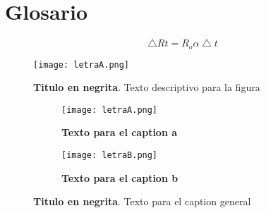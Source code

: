 
\newpage
\chapter*{Glosario}


\begin{equation}\label{eq:Label}
	\bigtriangleup Rt = R_{o}\alpha\bigtriangleup t 
\end{equation}


\begin{figure}[tb]
	\centering
	\texttt{[image: letraA.png]} %
	\caption[Titulo de la figura, este texto saldra en la lista de figuras]{\textbf{Titulo en negrita}. Texto descriptivo para la figura} 
	\label{fig:Agrande}
\end{figure}

\begin{figure}[tb]
	\centering
	\begin{subfigure}[t]{0.49\textwidth}
		\centering
		\texttt{[image: letraA.png]} %
		\caption{\textbf{Texto para el caption a}}
		\label{fig:A}
	\end{subfigure}
	\hfill
	\begin{subfigure}[t]{0.49\textwidth}
		\centering
		\texttt{[image: letraB.png]} %
		\caption{\textbf{Texto para el caption b}}
		\label{fig:B}
	\end{subfigure}
	
	\caption[Texto para la lista de figuras 1]{\textbf{Titulo en negrita}. Texto para el caption general \label{fig:Label}}
\end{figure}



